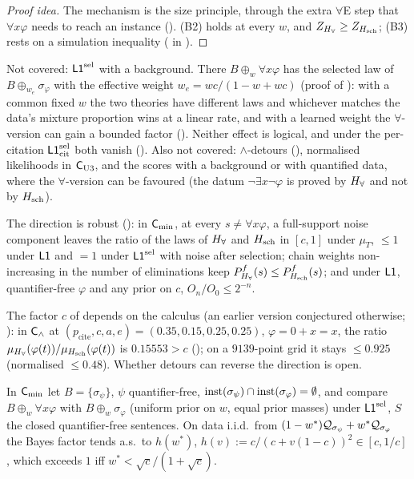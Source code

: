 \begin{proof}[Proof idea]
The mechanism is the size principle, through the extra $\forall$E step that $\forall x\varphi$ needs to reach an instance (). (B2) holds at every $w$, and $Z_{H_{\forall}}\ge Z_{H_{\mathrm{sch}}}$; (B3) rests on a simulation inequality ( in ).
\end{proof}

Not covered: $\mathord{\mathsf{L1}}^{\mathrm{sel}}$ with a background. There $B\oplus_w\forall x\varphi$ has the selected law of $B\oplus_{w_e}\sigma_\varphi$ with the effective weight $w_e=wc/(1-w+wc)$ (proof of ): with a common fixed $w$ the two theories have different laws and whichever matches the data's mixture proportion wins at a linear rate, and with a learned weight the $\forall$-version can gain a bounded factor (). Neither effect is logical, and under the per-citation $\mathord{\mathsf{L1}}^{\mathrm{sel}}_{\mathrm{cit}}$ both vanish (). Also not covered: $\wedge$-detours (), normalised likelihoods in $\mathsf{C}_{\mathrm{U3}}$, and the scores with a background or with quantified data, where the $\forall$-version can be favoured (the datum $\neg\exists x\neg\varphi$ is proved by $H_{\forall}$ and not by $H_{\mathrm{sch}}$).

The direction is robust (): in $\mathsf{C}_{\min}$, at every $s\neq\forall x\varphi$, a full-support noise component leaves the ratio of the laws of $H_{\forall}$ and $H_{\mathrm{sch}}$ in $[c,1]$ under $\mu_T$, $\le1$ under $\mathord{\mathsf{L1}}$ and $=1$ under $\mathord{\mathsf{L1}}^{\mathrm{sel}}$ with noise after selection; chain weights non-increasing in the number of eliminations keep $P^f_{H_{\forall}}(s)\le P^f_{H_{\mathrm{sch}}}(s)$; and under $\mathord{\mathsf{L1}}$, quantifier-free $\varphi$ and any prior on $c$, $O_n/O_0\le2^{-n}$.

\begin{remark}\label{rem:univ:detour}
The factor $c$ of  depends on the calculus (an earlier version conjectured otherwise; ): in $\mathsf{C}_{\wedge}$ at $(p_{\mathrm{cite}},c,a,e)=(0.35,0.15,0.25,0.25)$, $\varphi=0+x=x$, the ratio $\mu_{H_{\forall}}(\varphi(t))/\mu_{H_{\mathrm{sch}}}(\varphi(t))$ is $0.15553>c$ (); on a $9139$-point grid it stays $\le0.925$ (normalised $\le0.48$). Whether detours can reverse the direction is open.
\end{remark}

\begin{proposition}\label{prop:univ:B2}
In $\mathsf{C}_{\min}$ let $B=\{\sigma_\psi\}$, $\psi$ quantifier-free, $\mathrm{inst}(\sigma_\psi)\cap\mathrm{inst}(\sigma_\varphi)=\emptyset$, and compare $B\oplus_w\forall x\varphi$ with $B\oplus_w\sigma_\varphi$ (uniform prior on $w$, equal prior masses) under $\mathord{\mathsf{L1}}^{\mathrm{sel}}$, $S$ the closed quantifier-free sentences. On data i.i.d.\ from $(1-w^*)\mathcal{Q}_{\sigma_\psi}+w^*\mathcal{Q}_{\sigma_\varphi}$ the Bayes factor tends a.s.\ to $h(w^*)$, $h(v):=c/(c+v(1-c))^2\in[c,1/c]$, which exceeds $1$ iff $w^*<\sqrt c/(1+\sqrt c)$.
\end{proposition}

